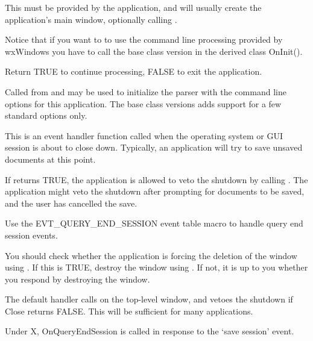 This must be provided by the application, and will usually create the
application's main window, optionally calling 
.

Notice that if you want to to use the command line processing provided by
wxWindows you have to call the base class version in the derived class
OnInit().

Return TRUE to continue processing, FALSE to exit the application.

\label{wxapponinitcmdline}


Called from  and may be used to initialize the
parser with the command line options for this application. The base class
versions adds support for a few standard options only.

\label{wxapponqueryendsession}


This is an event handler function called when the operating system or GUI session is
about to close down. Typically, an application will try to save unsaved documents
at this point.

If  returns TRUE, the application
is allowed to veto the shutdown by calling .
The application might veto the shutdown after prompting for documents to be saved, and the
user has cancelled the save.

Use the EVT\_QUERY\_END\_SESSION event table macro to handle query end session events.

You should check whether the application is forcing the deletion of the window
using . If this is TRUE,
destroy the window using .
If not, it is up to you whether you respond by destroying the window.

The default handler calls  on the top-level window,
and vetoes the shutdown if Close returns FALSE. This will be sufficient for many applications.


Under X, OnQueryEndSession is called in response to the `save session' event.

